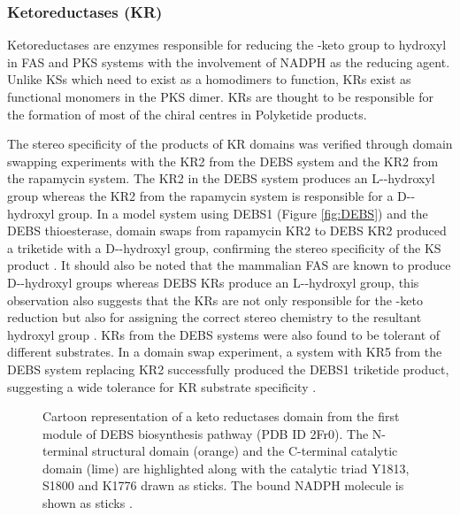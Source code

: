 			\subsubsection{Ketoreductases (KR)}
			\label{sec:KR} 
			Ketoreductases are enzymes responsible for reducing the \bet-keto group to hydroxyl in FAS and PKS systems with the involvement of NADPH as the reducing agent. Unlike KSs which need to exist as a homodimers to function, KRs exist as functional monomers in the PKS dimer. KRs are thought to be responsible for the formation of most of the chiral centres in Polyketide products. 
			
			The stereo specificity of the products of KR domains was verified through domain swapping experiments with the KR2 from the DEBS system and the KR2 from the rapamycin system. The KR2 in the DEBS system produces an L-\bet-hydroxyl group whereas the KR2 from the rapamycin system is responsible for a D-\bet-hydroxyl group. In a model system using DEBS1 (Figure \ref{fig:DEBS}) and the DEBS thioesterase, domain swaps from rapamycin KR2 to DEBS KR2 produced a triketide with a D-\bet-hydroxyl group, confirming the stereo specificity of the KS product \parencite{Cortes1995}. It should also be noted that the mammalian FAS are known to produce D-\bet-hydroxyl groups whereas DEBS KRs produce an L-\bet-hydroxyl group, this observation also suggests that the KRs are not only responsible for the \bet-keto reduction but also for assigning the correct stereo chemistry to the resultant hydroxyl group \parencite{Kao1998}. KRs from the DEBS systems were also found to be tolerant of different substrates. In a domain swap experiment, a system with KR5 from the DEBS system replacing KR2 successfully produced the DEBS1 triketide product, suggesting a wide tolerance for KR substrate specificity \parencite{Khosla1999}.
			
			\setlength\fboxsep{5pt}
			\setlength\fboxrule{1.5pt}
			\begin{figure} []
			\centering
			\caption[Cartoon representation of a keto reductases domain]{Cartoon representation of a keto reductases domain from the first module of DEBS biosynthesis pathway (PDB ID 2Fr0). The N-terminal structural domain (orange) and the C-terminal catalytic domain (lime) are highlighted along with the catalytic triad Y1813, S1800 and K1776 drawn as sticks. The bound NADPH molecule is shown as sticks \parencite{Keatinge-Clay2006}.}
			\label{fig:KR}
			\end{figure}
			
